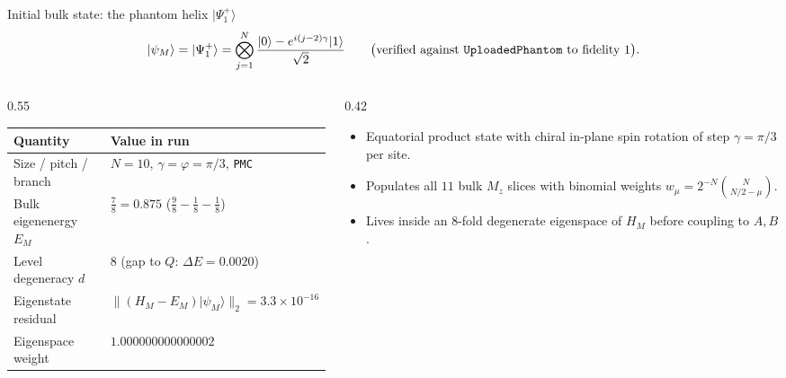 \documentclass[aspectratio=169,11pt]{beamer}
\newcommand{\ket}[1]{\lvert #1\rangle}
\begin{document}
\begin{frame}{Initial bulk state: the phantom helix $\ket{\Psi_1^+}$}
\small
\[
\ket{\psi_M}=\ket{\Psi_1^+} = \bigotimes_{j=1}^{N}\frac{\ket0 - e^{i(j-2)\gamma}\ket1}{\sqrt2}\qquad
\bigl(\text{verified against \texttt{UploadedPhantom} to fidelity }1\bigr).
\]
\begin{columns}[T,totalwidth=\textwidth]
\begin{column}{0.55\textwidth}
\footnotesize\setlength{\tabcolsep}{4pt}
\centering
\begin{tabular}{@{}ll@{}}
\toprule
Quantity & Value in run \\\midrule
Size / pitch / branch & $N=10$, $\gamma=\varphi=\pi/3$, \texttt{PMC} \\
Bulk eigenenergy $E_M$ & $\tfrac{7}{8}=0.875$ ($\tfrac{9}{8}-\tfrac{1}{8}-\tfrac{1}{8}$) \\
Level degeneracy $d$ & $8$ (gap to $Q$: $\Delta E=0.0020$) \\
Eigenstate residual & $\lVert(H_M-E_M)\ket{\psi_M}\rVert_2 = 3.3\times 10^{-16}$ \\
Eigenspace weight & $1.000000000000002$ \\\bottomrule
\end{tabular}
\end{column}
\begin{column}{0.42\textwidth}
\footnotesize
\begin{itemize}\setlength\itemsep{4pt}
\item Equatorial product state with chiral in-plane spin rotation of step $\gamma=\pi/3$ per site.
\item Populates all $11$ bulk $M_z$ slices with binomial weights $w_\mu = 2^{-N}\binom{N}{N/2-\mu}$.
\item Lives inside an $8$-fold degenerate eigenspace of $H_M$ before coupling to $A,B$.
\end{itemize}
\end{column}
\end{columns}
\end{frame}
\end{document}

